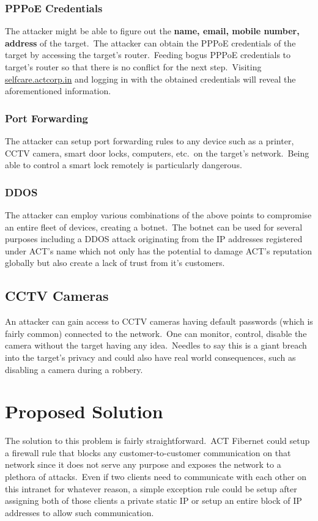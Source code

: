\documentclass[11pt]{article}
\begin{document}
    \subsubsection{PPPoE Credentials}
    The attacker might be able to figure out the \textbf{name, email, mobile number, address} of the target.\ The
    attacker can obtain the PPPoE credentials of the target by accessing the target's router.\ Feeding bogus PPPoE
    credentials to target's router so that there is no conflict for the next step.\ Visiting
    \href{https://selfcare.actcorp.in}{selfcare.actcorp.in} and logging in with the obtained credentials will reveal
    the aforementioned information.

    \subsubsection{Port Forwarding}
    The attacker can setup port forwarding rules to any device such as a printer, CCTV camera, smart door locks,
    computers, etc.\ on the target's network.\ Being able to control a smart lock remotely is particularly dangerous.

    \subsubsection{DDOS}
    The attacker can employ various combinations of the above points to compromise an entire fleet of devices,
    creating a botnet.\ The botnet can be used for several purposes including a DDOS attack originating from the IP
    addresses registered under ACT's name which not only has the potential to damage ACT's reputation globally but
    also create a lack of trust from it's customers.

    \subsection{CCTV Cameras}\label{subsec:cctv-cameras}
    An attacker can gain access to CCTV cameras having default passwords (which is fairly common) connected to the
    network.\ One can monitor, control, disable the camera without the target having any idea.\ Needles to say this
    is a giant breach into the target's privacy and could also have real world consequences, such as disabling a camera
    during a robbery.


    \section{Proposed Solution}\label{sec:proposed-solution}
    The solution to this problem is fairly straightforward.\ ACT Fibernet could setup a firewall rule that blocks any
    customer-to-customer communication on that network since it does not serve any purpose and exposes the network to a
    plethora of attacks.\ Even if two clients need to communicate with each other on this intranet for whatever
    reason, a simple exception rule could be setup after assigning both of those clients a private static IP or setup
    an entire block of IP addresses to allow such communication.
\end{document}
